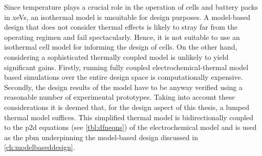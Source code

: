 Since temperature  plays a crucial  role in the  operation of cells  and battery
packs in \glspl{xeV},  an isothermal model is unsuitable for  design purposes. A
model-based design that does not consider thermal effects is likely to stray far
from the operating regimen and fail  spectacularly. Hence, it is not suitable to
use an  isothermal cell model  for informing the design  of cells. On  the other
hand, considering a  sophisticated thermally coupled model is  unlikely to yield
significant gains. Firstly, running  fully coupled electrochemical-thermal model
based simulations  over the  entire design  space is  computationally expensive.
Secondly,  the design  results of  the model  have to  be anyway  verified using
a  reasonable  number of  experimental  prototypes.  Taking into  account  these
considerations it is deemed that, for the design aspect of this thesis, a lumped
thermal model suffices. This simplified thermal model is bidirectionally coupled
to the \gls{p2d} equations (see \cref{tbl:dfneqns}) of the electrochemical model
and  is used  as the  \gls{pbm}  underpinning the  model-based design  discussed
in \cref{ch:modelbaseddesign}.






